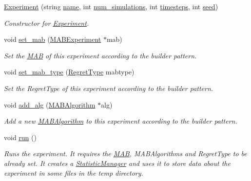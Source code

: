 \begin{DoxyCompactItemize}
\item 
\mbox{\hyperlink{class_experiment_ac89f5aa94daeec555004535271d36a17}{Experiment}} (string \mbox{\hyperlink{class_experiment_a2e451e5a87839f29986a54bf69715a79}{name}}, int \mbox{\hyperlink{class_experiment_ad95d4677faced6cf6b2d1f037f07901a}{num\+\_\+simulations}}, int \mbox{\hyperlink{class_experiment_a380452065b55d8e50a95b4f3608a80ca}{timesteps}}, int \mbox{\hyperlink{class_experiment_a5afc2955f4e99280fe0f4e8023582aec}{seed}})
\begin{DoxyCompactList}\small\item\em Constructor for \mbox{\hyperlink{class_experiment}{Experiment}}. \end{DoxyCompactList}\item 
void \mbox{\hyperlink{class_experiment_a7529561ca5ec4f7d1cd9b91bec8bd669}{set\+\_\+mab}} (\mbox{\hyperlink{class_m_a_b_experiment}{M\+A\+B\+Experiment}} $\ast$mab)
\begin{DoxyCompactList}\small\item\em Set the \mbox{\hyperlink{class_m_a_b}{M\+AB}} of this experiment according to the builder pattern. \end{DoxyCompactList}\item 
void \mbox{\hyperlink{class_experiment_ab2c105c70a67a5bed51b5d83c3b61e18}{set\+\_\+mab\+\_\+type}} (\mbox{\hyperlink{mab_8h_ab8d3b06b9f83219c5bb8daa68136f908}{Regret\+Type}} mabtype)
\begin{DoxyCompactList}\small\item\em Set the Regret\+Type of this experiment according to the builder pattern. \end{DoxyCompactList}\item 
void \mbox{\hyperlink{class_experiment_a0baf82bc31099824ce92d33899c78702}{add\+\_\+alg}} (\mbox{\hyperlink{class_m_a_b_algorithm}{M\+A\+B\+Algorithm}} $\ast$alg)
\begin{DoxyCompactList}\small\item\em Add a new \mbox{\hyperlink{class_m_a_b_algorithm}{M\+A\+B\+Algorithm}} to this experiment according to the builder pattern. \end{DoxyCompactList}\item 
void \mbox{\hyperlink{class_experiment_ac3467eb067f8623c9cf3cd7c736a8c80}{run}} ()
\begin{DoxyCompactList}\small\item\em Runs the experiment. It requires the \mbox{\hyperlink{class_m_a_b}{M\+AB}}, M\+A\+B\+Algorithms and Regret\+Type to be already set. It creates a \mbox{\hyperlink{class_statistic_manager}{Statistic\+Manager}} and uses it to store data about the experiment in some files in the temp directory. \end{DoxyCompactList}\end{DoxyCompactItemize}
